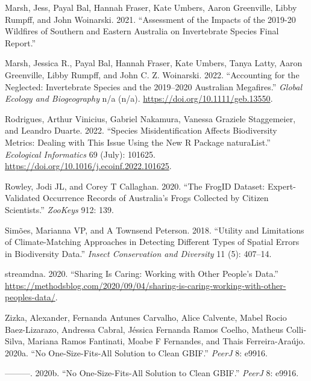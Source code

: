\documentclass[
  letterpaper,
  DIV=11,
  numbers=noendperiod,
  oneside]{scrreprt}
\newlength{\cslhangindent}
\newlength{\cslentryspacingunit} %
\newenvironment{CSLReferences}[2] %
 {%
  \setlength{\parindent}{0pt}
  \ifodd #1
  \let\oldpar\par
  \def\par{\hangindent=\cslhangindent\oldpar}
  \fi
  \setlength{\parskip}{#2\cslentryspacingunit}
 }%
 {}
\begin{document}
\begin{CSLReferences}{1}{0}
\leavevmode{}%
Marsh, Jess, Payal Bal, Hannah Fraser, Kate Umbers, Aaron Greenville,
Libby Rumpff, and John Woinarski. 2021. {``Assessment of the Impacts of
the 2019-20 Wildfires of Southern and Eastern Australia on Invertebrate
Species Final Report.''}

\leavevmode{}%
Marsh, Jessica R., Payal Bal, Hannah Fraser, Kate Umbers, Tanya Latty,
Aaron Greenville, Libby Rumpff, and John C. Z. Woinarski. 2022.
{``Accounting for the Neglected: {Invertebrate} Species and the
2019--2020 {Australian} Megafires.''} \emph{Global Ecology and
Biogeography} n/a (n/a). \url{https://doi.org/10.1111/geb.13550}.

\leavevmode{}%
Rodrigues, Arthur Vinicius, Gabriel Nakamura, Vanessa Graziele
Staggemeier, and Leandro Duarte. 2022. {``Species Misidentification
Affects Biodiversity Metrics: {Dealing} with This Issue Using the New
{R} Package {naturaList}.''} \emph{Ecological Informatics} 69 (July):
101625. \url{https://doi.org/10.1016/j.ecoinf.2022.101625}.

\leavevmode{}%
Rowley, Jodi JL, and Corey T Callaghan. 2020. {``The FrogID Dataset:
Expert-Validated Occurrence Records of Australia's Frogs Collected by
Citizen Scientists.''} \emph{ZooKeys} 912: 139.

\leavevmode{}%
Simões, Marianna VP, and A Townsend Peterson. 2018. {``Utility and
Limitations of Climate-Matching Approaches in Detecting Different Types
of Spatial Errors in Biodiversity Data.''} \emph{Insect Conservation and
Diversity} 11 (5): 407--14.

\leavevmode{}%
streamdna. 2020. {``Sharing Is {Caring}: {Working} with {Other} People's
{Data}.''}
\url{https://methodsblog.com/2020/09/04/sharing-is-caring-working-with-other-peoples-data/}.

\leavevmode{}%
Zizka, Alexander, Fernanda Antunes Carvalho, Alice Calvente, Mabel Rocio
Baez-Lizarazo, Andressa Cabral, Jéssica Fernanda Ramos Coelho, Matheus
Colli-Silva, Mariana Ramos Fantinati, Moabe F Fernandes, and Thais
Ferreira-Araújo. 2020a. {``No One-Size-Fits-All Solution to Clean
{GBIF}.''} \emph{PeerJ} 8: e9916.

\leavevmode{}%
---------. 2020b. {``No One-Size-Fits-All Solution to Clean GBIF.''}
\emph{PeerJ} 8: e9916.

\end{CSLReferences}
\end{document}
